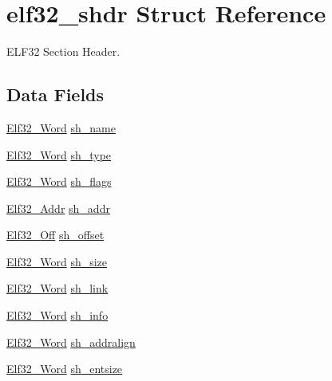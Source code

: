 \hypertarget{structelf32__shdr}{\section{elf32\+\_\+shdr Struct Reference}
\label{structelf32__shdr}
}


E\+L\+F32 Section Header.  


\subsection*{Data Fields}
\begin{DoxyCompactItemize}
\item 
\hyperlink{exec_8c_af5924ece606c732e86f8263a19408e45}{Elf32\+\_\+\+Word} \hyperlink{structelf32__shdr_aed9d0aea452a9da6af712011a65bdc2f}{sh\+\_\+name}
\item 
\hyperlink{exec_8c_af5924ece606c732e86f8263a19408e45}{Elf32\+\_\+\+Word} \hyperlink{structelf32__shdr_ab82e07582eb07fc53eec4dca36dddc83}{sh\+\_\+type}
\item 
\hyperlink{exec_8c_af5924ece606c732e86f8263a19408e45}{Elf32\+\_\+\+Word} \hyperlink{structelf32__shdr_a16f22e73ee4f9a4e8dbab7f44eaaa878}{sh\+\_\+flags}
\item 
\hyperlink{exec_8c_a40c6d4571e6001f443cc6a6474620158}{Elf32\+\_\+\+Addr} \hyperlink{structelf32__shdr_a7054ce2ce815d205d451bfe7ce2e145e}{sh\+\_\+addr}
\item 
\hyperlink{exec_8c_a655751f9b317369b93c581ea8ed84516}{Elf32\+\_\+\+Off} \hyperlink{structelf32__shdr_a4dea3a6fbd3a62a649d327b515c70cd6}{sh\+\_\+offset}
\item 
\hyperlink{exec_8c_af5924ece606c732e86f8263a19408e45}{Elf32\+\_\+\+Word} \hyperlink{structelf32__shdr_a4addb97e16e7303912fc84daa6f3ac77}{sh\+\_\+size}
\item 
\hyperlink{exec_8c_af5924ece606c732e86f8263a19408e45}{Elf32\+\_\+\+Word} \hyperlink{structelf32__shdr_a8e1564e04f3834397b394190934f7cee}{sh\+\_\+link}
\item 
\hyperlink{exec_8c_af5924ece606c732e86f8263a19408e45}{Elf32\+\_\+\+Word} \hyperlink{structelf32__shdr_a7063aa23af4d41832485d03b54f01626}{sh\+\_\+info}
\item 
\hyperlink{exec_8c_af5924ece606c732e86f8263a19408e45}{Elf32\+\_\+\+Word} \hyperlink{structelf32__shdr_a74275f49dbae08127832dc1061ed24ab}{sh\+\_\+addralign}
\item 
\hyperlink{exec_8c_af5924ece606c732e86f8263a19408e45}{Elf32\+\_\+\+Word} \hyperlink{structelf32__shdr_a0360b455d1586deda50df0adaa7a87e0}{sh\+\_\+entsize}
\end{DoxyCompactItemize}


